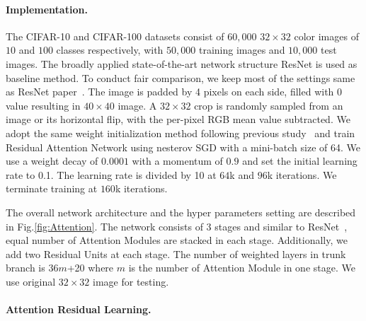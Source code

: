 \documentclass[10pt,twocolumn,letterpaper]{article}
\begin{document}
\paragraph{Implementation.}
\label{para:imple}
The CIFAR-10 and CIFAR-100 datasets consist of $60,000$ $32\times32$ color images of $10$ and $100$ classes respectively, with $50,000$ training images and $10,000$ test images.
%
The broadly applied state-of-the-art network structure ResNet is used as baseline method.
%
To conduct fair comparison, we keep most of the settings same as ResNet paper~\cite{resnet2016}.
%
The image is padded by 4 pixels on each side, filled with $0$ value resulting in $40\times40$ image. A $32\times32$ crop is randomly sampled from an image or its horizontal flip, with the per-pixel RGB mean value subtracted.
%
We adopt the same weight initialization method following previous study~\cite{prelu2015} and train Residual Attention Network using nesterov SGD with a mini-batch size of 64.
%
We use a weight decay of $0.0001$ with a momentum of $0.9$ and set the initial learning rate to 0.1. The learning rate is divided by 10 at $64$k and $96$k iterations. We terminate training at $160$k iterations.

The overall network architecture and the hyper parameters setting are described in Fig.\ref{fig:Attention}.
%
The network consists of 3 stages and similar to ResNet~\cite{resnet2016}, equal number of Attention Modules are stacked in each stage.
%
Additionally, we add two Residual Units at each stage. The number of weighted layers in trunk branch is 36$m$+20 where $m$ is the number of Attention Module in one stage.
%
We use original $32\times32$ image for testing.


\paragraph{Attention Residual Learning.}
\end{document}
